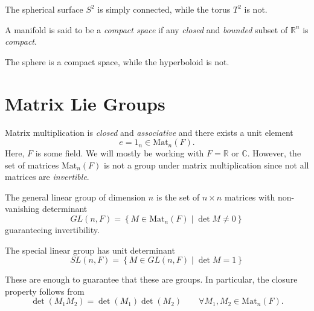 
\begin{example}[]
The spherical surface $S^2$ is simply connected, while the torus $T^2$ is not.
\end{example}

\begin{definition}[compact]
  A manifold is said to be a \emph{compact space} if any \emph{closed} and \emph{bounded} subset of $\mathbb{R}^n$ is \emph{compact}.
\end{definition}


\begin{example}[]
The sphere is a compact space, while the hyperboloid is not.
\end{example}

\section{Matrix Lie Groups}%
\label{sec:matrix_lie_groups}

Matrix multiplication is \emph{closed} and \emph{associative} and there exists a unit element
\begin{equation}
  e = 1_n \in \text{Mat}_n(F).
\end{equation}
Here, $F$ is some field. We will mostly be working with $F = \mathbb{R}$ or $\mathbb{C}$.
However, the set of matrices $\text{Mat}_n(F)$ is not a group under matrix multiplication since not all matrices are \emph{invertible}.

\begin{definition}
The general linear group of dimension $n$ is the set of $n \times n$ matrices with non-vanishing determinant
\begin{equation}
  GL(n, F) = \left\{ M \in \text{Mat}_n(F) \mid \det M \neq 0 \right\}
\end{equation}
guaranteeing invertibility.
\end{definition}

\begin{definition}
The special linear group has unit determinant
\begin{equation}
  SL(n, F) = \left\{ M \in GL(n, F) \mid \det M = 1 \right\}
\end{equation}
\end{definition}

These are enough to guarantee that these are groups. In particular, the closure property follows from
\begin{equation}
  \det(M_1 M_2) = \det(M_1) \det(M_2) \qquad \forall M_1, M_2 \in \text{Mat}_n(F).
\end{equation}

